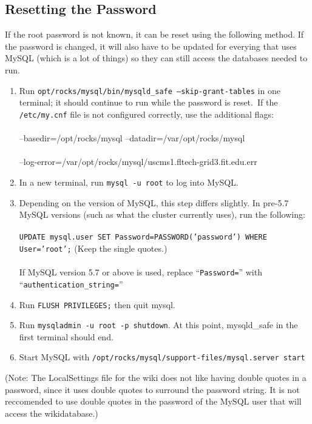 \documentclass[12pt]{article}
\begin{document}
\subsection{Resetting the Password}
If the root password is not known, it can be reset using the following method. If the password is changed, it will also have to be updated for everying that uses MySQL (which is a lot of things) so they can still access the databases needed to run.
\begin{enumerate}
\item Run {\tt opt/rocks/mysql/bin/mysqld\_safe --skip-grant-tables} in one terminal; it should continue to run while the password is reset.\
  If the {\tt/etc/my.cnf} file is not configured correctly, use the additional flags:
  \paragraph{}--basedir=/opt/rocks/mysql  --datadir=/var/opt/rocks/mysql
  \paragraph{}--log-error=/var/opt/rocks/mysql/uscms1.fltech-grid3.fit.edu.err
\item In a new terminal, run {\tt mysql -u root} to log into MySQL.
\item Depending on the version of MySQL, this step differs slightly. In pre-5.7 MySQL versions (such as what the cluster currently uses), run the following:
 \paragraph{} {\tt UPDATE mysql.user SET Password=PASSWORD('password') WHERE User='root';}    (Keep the single quotes.)\
  \paragraph{}If MySQL version 5.7 or above is used, replace ``{\tt Password=}'' with ``{\tt authentication\_string=}''
\item Run {\tt FLUSH PRIVILEGES;} then quit mysql.
\item Run {\tt mysqladmin -u root -p shutdown}. At this point, mysqld\_safe in the first terminal should end.
\item Start MySQL with {\tt /opt/rocks/mysql/support-files/mysql.server start}
\end{enumerate}

(Note: The LocalSettings file for the wiki does not like having double quotes in a password, since it uses double quotes to surround the password string. It is not reccomended to use double quotes in the password of the MySQL user that will access the wikidatabase.)
\end{document}
